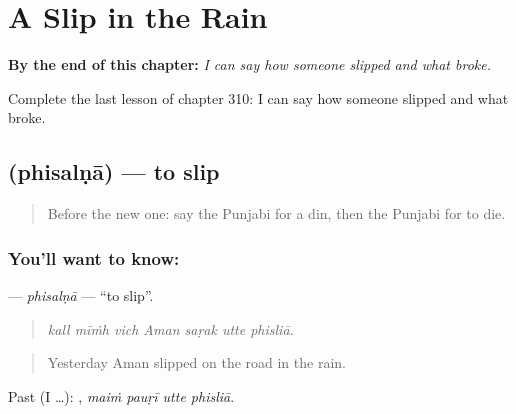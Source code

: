 
\chapter{A Slip in the Rain}
\label{ch:pa-a2-a-slip-in-the-rain}

\begin{chapteropening}
\textbf{By the end of this chapter:} \emph{I can say how someone slipped and what broke.}

Complete the last lesson of chapter 310: I can say how someone slipped and what broke.
\end{chapteropening}

\section[\texorpdfstring{\pa{ਫਿਸਲਣਾ} (phisalṇā)}{ਫਿਸਲਣਾ (phisalṇā)}]{ (phisalṇā) — to slip}

\label{lesson:PA-C310-phisalna}



\begin{quote}
Before the new one: say the Punjabi for a din, then the Punjabi for to die.
\end{quote}

\subsection*{You'll want to know: }
\textbf{} — \emph{phisalṇā} — \textquotedblleft{}to slip\textquotedblright{}.

\begin{quote}
      
\end{quote}

\begin{quote}
\emph{kall mīṁh vich Aman saṛak utte phisliā.}
\end{quote}

\begin{quote}
Yesterday Aman slipped on the road in the rain.
\end{quote}

Past (I …):    , \emph{maiṁ pauṛī utte phisliā}.


